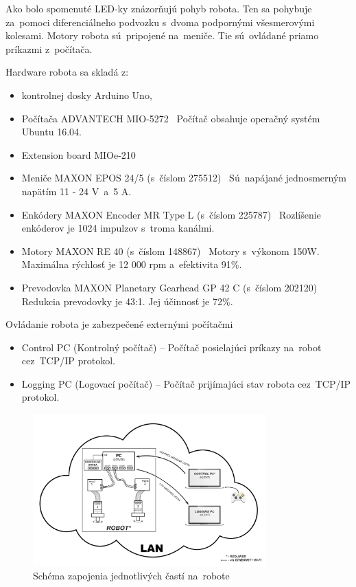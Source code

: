Ako bolo spomenuté LED-ky znázorňujú pohyb robota. Ten sa pohybuje za~pomoci diferenciálneho podvozku s~dvoma podpornými všesmerovými kolesami.
Motory robota sú~pripojené na~meniče. Tie sú~ovládané priamo príkazmi z~počítača.

Hardware robota sa skladá z:
\begin{itemize}
	\item kontrolnej dosky Arduino Uno,

	\item Počítača ADVANTECH MIO-5272~\cite{robotPc} \newline
		Počítač obsahuje operačný systém Ubuntu 16.04.

	\item Extension board MIOe-210~\cite{extensionModule}

	\item Meniče MAXON EPOS 24/5 (s~číslom 275512)~\cite{menic} \newline
	 	Sú~napájané jednosmerným napätím 11 - 24 V~a~5 A.

	\item Enkódery MAXON Encoder MR Type L (s~číslom 225787)~\cite{encoder} \newline
		Rozlíšenie enkóderov je 1024 impulzov s~troma kanálmi.

	\item Motory MAXON RE 40 (s~číslom 148867)~\cite{motor} \newline
		Motory s~výkonom 150W. Maximálna rýchlosť je 12 000 rpm a~efektivita 91\%.

	\item Prevodovka MAXON Planetary Gearhead GP 42 C (s~číslom 202120)~\cite{prevodovka} \newline
		Redukcia prevodovky je 43:1. Jej účinnosť je 72\%.
\end{itemize}

\noindent Ovládanie robota je zabezpečené externými počítačmi
\begin{itemize}
	\item Control PC (Kontrolný počítač) -- Počítač posielajúci príkazy na~robot cez~TCP/IP protokol.
	\item Logging PC (Logovací počítač) -- Počítač prijímajúci stav robota cez~TCP/IP protokol.
\end{itemize}

\begin{figure}[!htbp]
	\begin{center}
		\includegraphics[width=9cm]{img/schemaRobota.png}
	\end{center}
	\caption{Schéma zapojenia jednotlivých častí na~robote}
	\label{fig:schemaRobota}
\end{figure}

